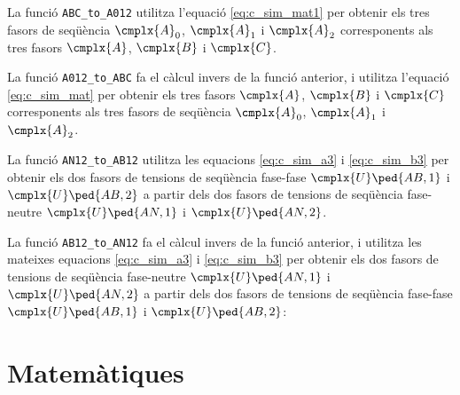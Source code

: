 


La funció \texttt{ABC\_to\_A012} utilitza l'equació \eqref{eq:c_sim_mat1} per obtenir els tres fasors de seqüència
$\cmplx{A}_0$, $\cmplx{A}_1$ i  $\cmplx{A}_2$ corresponents als tres fasors $\cmplx{A}$, $\cmplx{B}$ i $\cmplx{C}$.




La funció \texttt{A012\_to\_ABC} fa el càlcul  invers de la funció anterior, i utilitza l'equació \eqref{eq:c_sim_mat} per obtenir els tres fasors
$\cmplx{A}$, $\cmplx{B}$ i $\cmplx{C}$  corresponents als tres fasors de seqüència
$\cmplx{A}_0$, $\cmplx{A}_1$ i  $\cmplx{A}_2$.




La funció \texttt{AN12\_to\_AB12} utilitza les equacions  \eqref{eq:c_sim_a3} i \eqref{eq:c_sim_b3} per obtenir els dos fasors de tensions de seqüència fase-fase $\cmplx{U}\ped{AB,1}$ i  $\cmplx{U}\ped{AB,2}$ a partir dels dos fasors de tensions de seqüència fase-neutre $\cmplx{U}\ped{AN,1}$ i $\cmplx{U}\ped{AN,2}$.




La funció \texttt{AB12\_to\_AN12} fa el càlcul invers de la funció anterior, i utilitza les mateixes equacions  \eqref{eq:c_sim_a3} i \eqref{eq:c_sim_b3} per obtenir els dos fasors de tensions de seqüència fase-neutre $\cmplx{U}\ped{AN,1}$ i $\cmplx{U}\ped{AN,2}$ a partir dels dos fasors de tensions de seqüència fase-fase $\cmplx{U}\ped{AB,1}$ i  $\cmplx{U}\ped{AB,2}$:




\section{Matemàtiques}\label{sec:HP_MATH}

